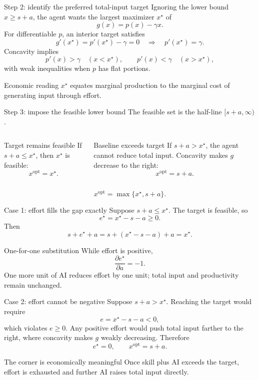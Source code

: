 \documentclass[aspectratio=169,10pt]{beamer}
\begin{document}
\begin{frame}{Step 2: identify the preferred total-input target}
Ignoring the lower bound $x\ge s+a$, the agent wants the largest maximizer $x^\star$ of
\[
g(x)=p(x)-\gamma x.
\]
For differentiable $p$, an interior target satisfies
\[
g'(x^\star)=p'(x^\star)-\gamma=0
\quad\Longrightarrow\quad
p'(x^\star)=\gamma.
\]
Concavity implies
\[
p'(x)>\gamma\quad(x<x^\star),
\qquad
p'(x)<\gamma\quad(x>x^\star),
\]
with weak inequalities when $p$ has flat portions.
\begin{exampleblock}{Economic reading}
$x^\star$ equates marginal production to the marginal cost of generating input through effort.
\end{exampleblock}
\end{frame}

\begin{frame}{Step 3: impose the feasible lower bound}
The feasible set is the half-line $[s+a,\infty)$.
\begin{columns}[T,onlytextwidth]
\begin{block}{Target remains feasible}
If $s+a\le x^\star$, then $x^\star$ is feasible:
\[
x^{\mathrm{opt}}=x^\star.
\]
\end{block}
\begin{alertblock}{Baseline exceeds target}
If $s+a>x^\star$, the agent cannot reduce total input. Concavity makes $g$ decrease to the right:
\[
x^{\mathrm{opt}}=s+a.
\]
\end{alertblock}
\end{columns}
\vspace{4mm}
\[
\boxed{x^{\mathrm{opt}}=\max\{x^\star,s+a\}.}
\]
\end{frame}

\begin{frame}{Case 1: effort fills the gap exactly}
Suppose $s+a\le x^\star$. The target is feasible, so
\[
e^\star=x^\star-s-a\ge0.
\]
Then
\[
s+e^\star+a
=s+(x^\star-s-a)+a
=x^\star.
\]
\begin{block}{One-for-one substitution}
While effort is positive,
\[
\frac{\partial e^\star}{\partial a}=-1.
\]
One more unit of AI reduces effort by one unit; total input and productivity remain unchanged.
\end{block}
\end{frame}

\begin{frame}{Case 2: effort cannot be negative}
Suppose $s+a>x^\star$. Reaching the target would require
\[
e=x^\star-s-a<0,
\]
which violates $e\ge0$.
\vspace{2mm}
Any positive effort would push total input farther to the right, where concavity makes $g$ weakly decreasing. Therefore
\[
e^\star=0,
\qquad
x^{\mathrm{opt}}=s+a.
\]
\begin{alertblock}{The corner is economically meaningful}
Once skill plus AI exceeds the target, effort is exhausted and further AI raises total input directly.
\end{alertblock}
\end{frame}
\end{document}
